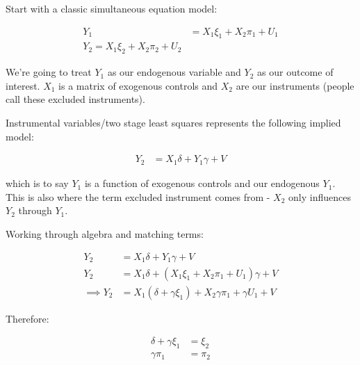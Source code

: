 \documentclass{article}
\begin{document}
   


Start with a classic simultaneous equation model:

\begin{align*}
    Y_1 &= X_1 \xi_1 + X_2 \pi_1 + U_1 \\
    Y_2 = X_1 \xi_2 + X_2 \pi_2 + U_2
\end{align*}

We're going to treat $Y_1$ as our endogenous variable and $Y_2$ as our outcome 
of interest. $X_1$ is a matrix of exogenous controls and $X_2$ are our instruments 
(people call these excluded instruments).

Instrumental variables/two stage least squares represents the following implied model:

\begin{align*}
    Y_2 &= X_1 \delta + Y_1 \gamma + V
\end{align*}


which is to say $Y_1$ is a function of exogenous controls and our endogenous $Y_1$. 
This is also where the term excluded instrument comes from - $X_2$ only influences 
$Y_2$ through $Y_1$.


Working through algebra and matching terms:

\begin{align*}
    Y_2 &= X_1 \delta + Y_1 \gamma + V \\
    Y_2 &= X_1 \delta + (X_1 \xi_1 + X_2 \pi_1 + U_1) \gamma + V \\
    \implies Y_2 &= X_1 (\delta + \gamma \xi_1) + X_2 \gamma \pi_1 + \gamma U_1 + V
\end{align*}

Therefore:

\begin{align*}
    \delta + \gamma \xi_1 &= \xi_2 \\
    \gamma \pi_1 &= \pi_2
\end{align*}
\end{document}
